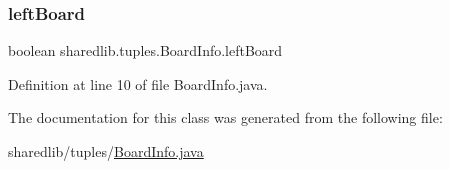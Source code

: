 \subsubsection{\texorpdfstring{left\+Board}{leftBoard}}
{\footnotesize\ttfamily boolean sharedlib.\+tuples.\+Board\+Info.\+left\+Board}



Definition at line 10 of file Board\+Info.\+java.



The documentation for this class was generated from the following file\+:\begin{DoxyCompactItemize}
\item 
sharedlib/tuples/\hyperlink{_board_info_8java}{Board\+Info.\+java}\end{DoxyCompactItemize}
